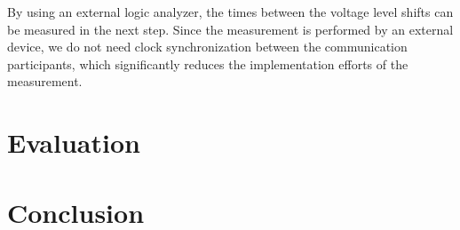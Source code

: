 \documentclass[conference, onecolumn, a4paper]{IEEEtran}
\begin{document}
\smallskip
By using an external logic analyzer, the times between the voltage level shifts can be measured in the next step. Since the measurement is performed by 
an external device, we do not need clock synchronization between the communication participants, which significantly reduces the implementation efforts  
of the measurement.

\section{Evaluation}
\label{chapter:evaluation}


\section{Conclusion}
\label{chapter:conclusion}


\printbibliography

\end{document}
